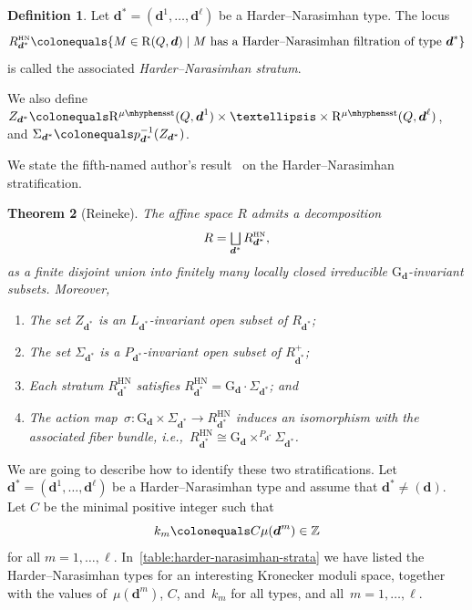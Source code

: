 \documentclass[11pt]{article}
\let\oldbigsqcup\bigsqcup
\renewcommand{\bigsqcup}{\mathop{\textstyle\oldbigsqcup}\displaylimits}
\theoremstyle{plain}
\newtheorem{theorem}{Theorem}[section]
\theoremstyle{definition}
\newtheorem{definition}[theorem]{Definition}
\newcommand\blade[1][]{\Sigma_{#1}}
\newcommand\group[1][\tuple{d}]{\mathrm{G}_{#1}}
\newcommand\HN{\ensuremath{{\scriptscriptstyle\mathrm{HN}}}}
\newcommand\semistable{\ensuremath{\mhyphen\mathrm{sst}}}
\newcommand\tuple[1]{\ensuremath{{\boldsymbol{#1}}}}
\begin{document}
\begin{definition}
\label{definition:harder-narasimhan-strata}
Let $\tuple{d}^* = (\tuple{d}^1,\ldots,\tuple{d}^\ell)$ be a Harder--Narasimhan type.
The locus
\begin{equation*}
R_{\tuple{d}^*}^{\HN} \colonequals \{ M \in \repspace{Q,\tuple{d}} \mid \text{$M$ has a Harder--Narasimhan filtration of type $\tuple{d}^*$}\}
\end{equation*}
is called the associated \emph{Harder--Narasimhan stratum}.

We also define $Z_{\tuple{d}^*} \colonequals \repspace[\mu\semistable]{Q,\tuple{d}^1} \times \ldots \times \repspace[\mu\semistable]{Q,\tuple{d}^\ell}$,
and $\blade[\tuple{d}^*] \colonequals p_{\tuple{d}^*}^{-1}(Z_{\tuple{d}^*})$.
\end{definition}

We state the fifth-named author's result~\cite[Prop.\,3.4]{MR1974891} on the Harder--Nara\-sim\-han stratification.

\begin{theorem}[Reineke]
\label{theorem:HN-stratification}
The affine space $R$ admits a decomposition
\begin{equation*}
R = \bigsqcup_{\tuple{d}^*} R_{\tuple{d}^*}^{\HN},
\end{equation*}
as a finite disjoint union into finitely many locally closed irreducible $\group$-invariant subsets. Moreover,
\begin{enumerate}
\item The set $Z_{\tuple{d}^*}$ is an $L_{\tuple{d}^*}$-invariant open subset of $R_{\tuple{d}^*}$;
\item The set $\blade[\tuple{d}^*]$ is a $P_{\tuple{d}^*}$-invariant open subset of $R_{\tuple{d}^*}^+$;
\item Each stratum $R_{\tuple{d}^*}^{\HN}$ satisfies $R_{\tuple{d}^*}^{\HN} = {\group}\cdot \blade[\tuple{d}^*]$; and
\item \label{item:action-map} The action map~$\sigma\colon\group \times \blade[\tuple{d}^*] \to R_{\tuple{d}^*}^{\HN}$
induces an isomorphism with the associated fiber bundle,
i.e.,~$R_{\tuple{d}^*}^{\HN} \cong \group \times^{P_{\tuple{d}^*}} \blade[\tuple{d}^*]$.
\end{enumerate}
\end{theorem}

We are going to describe how to identify these two stratifications.
Let $\tuple{d}^* = (\tuple{d}^1,\ldots,\tuple{d}^\ell)$ be a Harder--Narasimhan type
and assume that $\tuple{d}^* \neq (\tuple{d})$.
Let $C$ be the minimal positive integer such that
\begin{equation}
\label{equation:ks}
k_m\colonequals C\mu(\tuple{d}^m) \in \mathbb{Z}
\end{equation}
for all $m=1,\ldots,\ell$. In~\cref{table:harder-narasimhan-strata} we have listed the Harder--Narasimhan types
for an interesting Kronecker moduli space,
together with the values of~$\mu(\tuple{d}^m)$, $C$, and~$k_m$
for all types, and all~$m=1,\ldots,\ell$.
\end{document}
